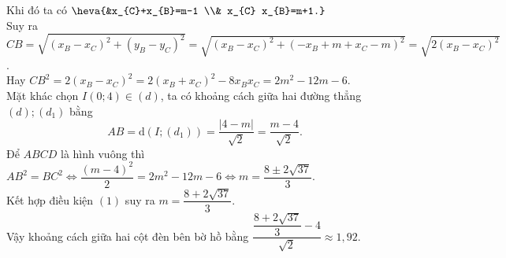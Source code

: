 \begin{bt}
{\[		\] 
		Khi đó ta có $\heva{&x_{C}+x_{B}=m-1 \\& x_{C} x_{B}=m+1.}$\\ 
		Suy ra $ C B=\sqrt{\left(x_{B}-x_{C}\right)^{2}+\left(y_{B}-y_{C}\right)^{2}}=\sqrt{\left(x_{B}-x_{C}\right)^{2}+\left(-x_{B}+m+x_{C}-m\right)^{2}}=\sqrt{2\left(x_{B}-x_{C}\right)^{2}}$.\\ 
		Hay $C  B^{2}=2\left(x_{B}-x_{C}\right)^{2}=2\left(x_{B}+x_{C}\right)^{2}-8 x_{B} x_{C}=2 m^{2}-12 m-6$.\\
		Mặt khác chọn $ I(0;  4) \in (d)$, ta có khoảng cách giữa hai đường thẳng $ (d);\left(d_{1}\right) $ bằng
		 \[
		 A B=\mathrm{d}\left(I;\left(d_{1}\right)\right)=\dfrac{|4-m|}{\sqrt{2}}=\dfrac{m-4}{\sqrt{2}}.
		\] 
		Để $ A B C D $ là hình vuông thì $ A B^{2}=B C^{2} \Leftrightarrow \dfrac{(m-4)^{2}}{2}=2 m^{2}-12 m-6 \Leftrightarrow m=\dfrac{8 \pm  2 \sqrt{37}}{3} $.\\
		Kết hợp điều kiện $(1)$ suy ra $  m=\dfrac{8+2 \sqrt{37}}{3} $.\\
		Vậy khoảng cách  giữa hai cột đèn bên bờ hồ bằng $ \dfrac{\dfrac{8+2 \sqrt{37}}{3}-4}{\sqrt{2}} \approx 1{,}92 $.
	 }
\end{bt}



